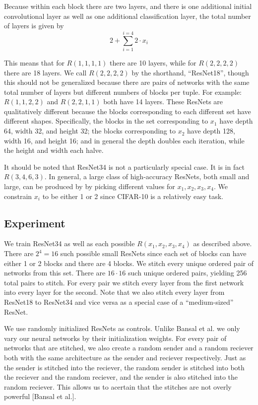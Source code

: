 \documentclass{article} %
\begin{document}
Because within each block there are two layers, and there is one
additional initial convolutional layer as well as one additional classification layer, the total number
of layers is given by
\[2 + \sum_{i=1}^{i=4} 2 \cdot x_i \]

This means that for $R(1, 1, 1, 1)$ there are 10 layers, while for $R(2, 2, 2, 2)$ there are 18 layers. We call
$R(2, 2, 2, 2)$ by the shorthand, ``ResNet18'', though this should not be generalized because there are pairs
of networks with the same total number of layers but different numbers of blocks per tuple. For example:
$R(1, 1, 2, 2)$ and $R(2, 2, 1, 1)$ both have 14 layers. These ResNets are qualitatively different
because the blocks corresponding to each different set have different shapes. Specifically, the blocks in
the set corresponding to $x_1$ have depth 64, width 32, and height 32; the blocks corresponding to $x_2$ have
depth 128, width 16, and height 16; and in general the depth doubles each iteration,
while the height and width each halve.

It should be noted that ResNet34 is not a particularly special case. It is in fact $R(3, 4, 6, 3)$. In general,
a large class of high-accuracy ResNets, both small and large, can be produced by by picking different values for
$x_1, x_2, x_3, x_4$. We constrain $x_i$ to be either 1 or 2 since CIFAR-10 is a relatively easy task.

\subsection*{Experiment}
We train ResNet34 as well as each possible $R(x_1, x_2, x_3, x_4)$ as described above. There are $2^4 = 16$ such possible
small ResNets since each set of blocks can have either 1 or 2 blocks and there are 4 blocks. We stitch every unique ordered
pair of networks from this set. There are $16 \cdot 16$ such unique ordered pairs, yielding 256 total pairs to stitch.
For every pair we stitch every layer from the first network into every layer for the second. Note that we also stitch
every layer from ResNet18 to ResNet34 and vice versa as a special case of a ``medium-sized'' ResNet.

We use randomly initialized ResNets as controls. Unlike Bansal et al. we only vary our neural networks by their
initialization weights. For every pair of networks that are stitched, we also create a random sender and a random
reciever both with the same architecture as the sender and reciever respectively. Just as the sender is stitched
into the reciever, the random sender is stitched into both the reciever and the random reciever, and the sender
is also stitched into the random reciever. This allows us to acertain that the stitches
are not overly powerful [Bansal et al.].
\end{document}
